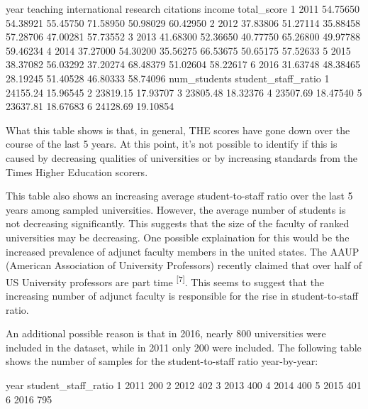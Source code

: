\documentclass[12pt]{article}
\begin{document}
\begin{Schunk}
\begin{Soutput}
  year teaching international research citations   income total_score
1 2011 54.75650      54.38921 55.45750  71.58950 50.98029    60.42950
2 2012 37.83806      51.27114 35.88458  57.28706 47.00281    57.73552
3 2013 41.68300      52.36650 40.77750  65.26800 49.97788    59.46234
4 2014 37.27000      54.30200 35.56275  66.53675 50.65175    57.52633
5 2015 38.37082      56.03292 37.20274  68.48379 51.02604    58.22617
6 2016 31.63748      48.38465 28.19245  51.40528 46.80333    58.74096
  num_students student_staff_ratio
1     24155.24            15.96545
2     23819.15            17.93707
3     23805.48            18.32376
4     23507.69            18.47540
5     23637.81            18.67683
6     24128.69            19.10854
\end{Soutput}
\end{Schunk}

What this table shows is that, in general, THE scores have gone down over the course of the last 5 years. At this point, it's not possible to identify if this is caused by decreasing qualities of universities or by increasing standards from the Times Higher Education scorers.

This table also shows an increasing average student-to-staff ratio over the last 5 years among sampled universities. However, the average number of students is not decreasing significantly. This suggests that the size of the faculty of ranked universities may be decreasing. One possible explaination for this would be the increased prevalence of adjunct faculty members in the united states. The AAUP (American Association of University Professors) recently claimed that over half of US University professors are part time \textsuperscript{[7]}. This seems to suggest that the increasing number of adjunct faculty is responsible for the rise in student-to-staff ratio.

An additional possible reason is that in 2016, nearly 800 universities were included in the dataset, while in 2011 only 200 were included. 
The following table shows the number of samples for the student-to-staff ratio year-by-year:

\begin{Schunk}
\begin{Soutput}
  year student_staff_ratio
1 2011                 200
2 2012                 402
3 2013                 400
4 2014                 400
5 2015                 401
6 2016                 795
\end{Soutput}
\end{Schunk}
\end{document}
